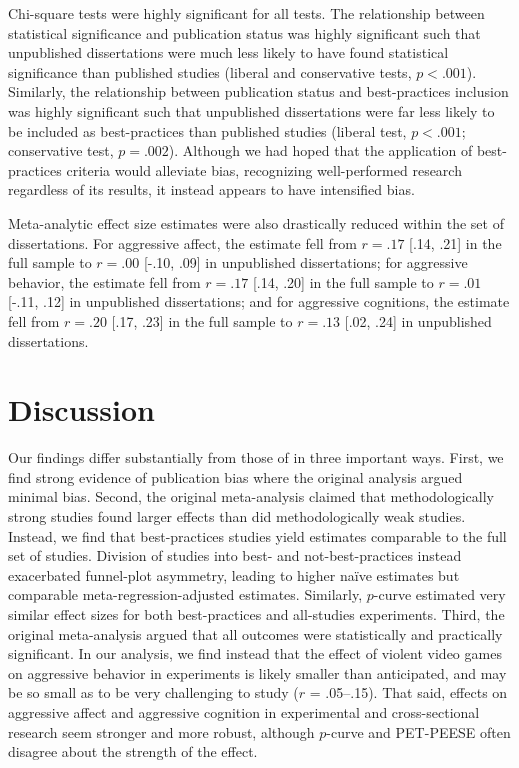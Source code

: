 \documentclass[man]{apa6}
\begin{document}
Chi-square tests were highly significant for all tests. The relationship between statistical significance and publication status was highly significant such that unpublished dissertations were much less likely to have found statistical significance than published studies (liberal and conservative tests, $p < .001$).
Similarly, the relationship between publication status and best-practices inclusion was highly significant such that unpublished dissertations were far less likely to be included as best-practices than published studies (liberal test, $p < .001$; conservative test, $p = .002$). 
Although we had hoped that the application of best-practices criteria would alleviate bias, recognizing well-performed research regardless of its results, it instead appears to have intensified bias.

Meta-analytic effect size estimates were also drastically reduced within the set of dissertations. For aggressive affect, the estimate fell from $r = .17$ [.14, .21] in the full sample to $r = .00$ [-.10, .09] in unpublished dissertations; for aggressive behavior, the estimate fell from $r = .17$ [.14, .20] in the full sample to $r = .01$ [-.11, .12] in unpublished dissertations; and for aggressive cognitions, the estimate fell from $r = .20$ [.17, .23] in the full sample to $r =  .13$ [.02, .24] in unpublished dissertations.  

\section{Discussion}
Our findings differ substantially from those of \citet{Anderson:etal:2010} in three important ways. First, we find strong evidence of publication bias where the original analysis argued minimal bias. Second, the original meta-analysis claimed that methodologically strong studies found larger effects than did methodologically weak studies. Instead, we find that best-practices studies yield estimates comparable to the full set of studies. Division of studies into best- and not-best-practices instead exacerbated funnel-plot asymmetry, leading to higher na{\"i}ve estimates but comparable meta-regression-adjusted estimates. Similarly, $p$-curve estimated very similar effect sizes for both best-practices and all-studies experiments. 
Third, the original meta-analysis argued that all outcomes were statistically and practically significant. In our analysis, we find instead that the effect of violent video games on aggressive behavior in experiments is likely smaller than anticipated, and may be so small as to be very challenging to study ($r$ = .05--.15). That said, effects on aggressive affect and aggressive cognition in experimental and cross-sectional research seem stronger and more robust, although $p$-curve and PET-PEESE often disagree about the strength of the effect.
\end{document}
